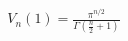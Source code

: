 \documentclass[preview]{standalone}
\begin{document}
\begin{align*}
V_n(1) = \frac{\pi^{n/2}}{\Gamma(\frac{n}{2} + 1)}
\end{align*}
\end{document}
